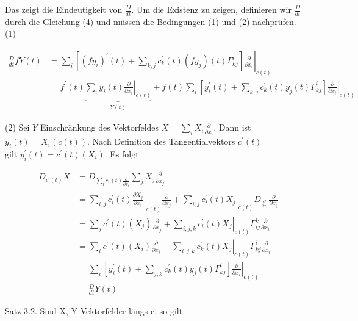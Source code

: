 \documentclass[10pt, letterpaper]{article}
\begin{document}
Das zeigt die Eindeutigkeit von $\frac{D}{d t}$. Um die Existenz zu zeigen, definieren wir $\frac{D}{d t}$ durch die Gleichung (4) und müssen die Bedingungen (1) und (2) nachprüfen.\\
(1)

$$
\begin{aligned}
\frac{D}{d t} f Y(t) & =\left.\sum_{i}\left[\left(f y_{i}\right)^{\prime}(t)+\sum_{k, j} c_{k}^{\prime}(t)\left(f y_{j}\right)(t) \Gamma_{k j}^{i}\right] \frac{\partial}{\partial x_{i}}\right|_{c(t)} \\
& =f^{\prime}(t) \underbrace{\left.\sum_{i} y_{i}(t) \frac{\partial}{\partial x_{i}}\right|_{c(t)}}_{Y(t)}+\left.f(t) \sum_{i}\left[y_{i}^{\prime}(t)+\sum_{k, j} c_{k}^{\prime}(t) y_{j}(t) \Gamma_{k j}^{i}\right] \frac{\partial}{\partial x_{i}}\right|_{c(t)}
\end{aligned}
$$

(2) Sei $Y$ Einschränkung des Vektorfeldes $X=\sum_{i} X_{i} \frac{\partial}{\partial x_{i}}$. Dann ist $y_{i}(t)=X_{i}(c(t))$. Nach Definition des Tangentialvektors $c^{\prime}(t)$\\
gilt $y_{i}^{\prime}(t)=c^{\prime}(t)\left(X_{i}\right)$. Es folgt

$$
\begin{aligned}
D_{c^{\prime}(t)} X & =D_{\sum_{i} c_{i}^{\prime}(t) \frac{\partial}{\partial x_{i}}} \sum_{j} X_{j} \frac{\partial}{\partial x_{j}} \\
& =\left.\sum_{i, j} c_{i}^{\prime}(t) \frac{\partial X_{j}}{\partial x_{i}}\right|_{c(t)} \frac{\partial}{\partial x_{j}}+\left.\sum_{i, j} c_{i}^{\prime}(t) X_{j}\right|_{c(t)} D_{\frac{\partial}{\partial x_{i}}} \frac{\partial}{\partial x_{j}} \\
& =\sum_{j} c^{\prime}(t)\left(X_{j}\right) \frac{\partial}{\partial x_{j}}+\left.\sum_{i, j, k} c_{i}^{\prime}(t) X_{j}\right|_{c(t)} \Gamma_{i j}^{k} \frac{\partial}{\partial x_{k}} \\
& =\sum_{i} c^{\prime}(t)\left(X_{i}\right) \frac{\partial}{\partial x_{i}}+\left.\sum_{i, j, k} c_{k}^{\prime}(t) X_{j}\right|_{c(t)} \Gamma_{k j}^{i} \frac{\partial}{\partial x_{i}} \\
& =\left.\sum_{i}\left[y_{i}^{\prime}(t)+\sum_{j, k} c_{k}^{\prime}(t) y_{j}(t) \Gamma_{k j}^{i}\right] \frac{\partial}{\partial x_{i}}\right|_{c(t)} \\
& =\frac{D}{d t} Y(t)
\end{aligned}
$$

Satz 3.2. Sind X, Y Vektorfelder längs c, so gilt
\end{document}
